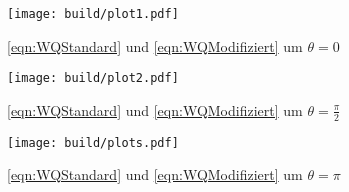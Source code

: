 \begin{figure}
  \centering
  \texttt{[image: build/plot1.pdf]}
  \caption{\eqref{eqn:WQStandard} und \eqref{eqn:WQModifiziert} um $\theta = 0$}
  \label{fig:t0}
\end{figure}

\begin{figure}
  \centering
  \texttt{[image: build/plot2.pdf]}
  \caption{\eqref{eqn:WQStandard} und \eqref{eqn:WQModifiziert} um $\theta = \frac{\pi}{2}$}
  \label{fig:tpi2}
\end{figure}

\begin{figure}
  \centering
  \texttt{[image: build/plots.pdf]}
  \caption{\eqref{eqn:WQStandard} und \eqref{eqn:WQModifiziert} um $\theta = \pi$}
  \label{fig:tpi}
\end{figure}


